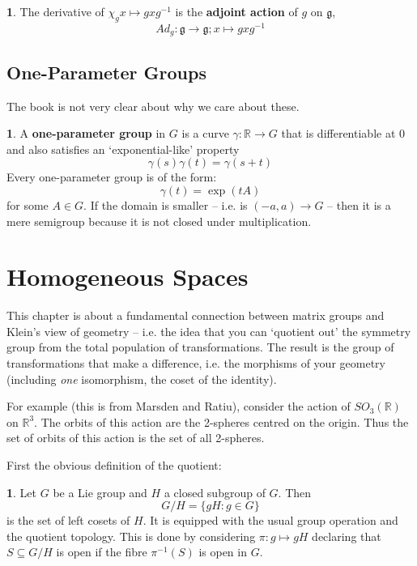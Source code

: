 \documentclass[oneside,english]{amsbook}
\numberwithin{section}{chapter}
\theoremstyle{plain}
\theoremstyle{definition}
\newtheorem{defn}[thm]{\protect\definitionname}
\providecommand{\definitionname}{Definition}
\begin{document}
\begin{defn}
	The derivative of $\chi_g x\mapsto gxg^{-1}$ is the \textbf{adjoint action} of $g$ on $\mathfrak{g}$,
	\[
		Ad_g:\mathfrak{g}\to \mathfrak{g} ; x\mapsto gxg^{-1}
	\]
\end{defn}



\subsection{One-Parameter Groups}

The book is not very clear about why we care about these.

\begin{defn}
	A \textbf{one-parameter group} in $G$ is a curve $\gamma: \mathbb{R}\to G$ that is differentiable at 0 and also satisfies an `exponential-like' property
	\[
	\gamma(s)\gamma(t) = \gamma(s + t)
	\]
	Every one-parameter group is of the form:
	\[
	\gamma(t) = \exp(tA)
	\]
	for some $A\in G$.
	If the domain is smaller -- i.e. is $(-a, a)\to G$ -- then it is a mere semigroup because it is not closed under multiplication.
\end{defn}

\section{Homogeneous Spaces}

This chapter is about a fundamental connection between matrix groups and Klein's view of geometry -- i.e. the idea that you can `quotient out' the symmetry group from the total population of transformations. The result is the group of transformations that make a difference, i.e. the morphisms of your geometry (including \emph{one} isomorphism, the coset of the identity).

For example (this is from Marsden and Ratiu), consider the action of $SO_3(\mathbb{R})$ on $\mathbb{R}^3$. The orbits of this action are the 2-spheres centred on the origin. Thus the set of orbits of this action is the set of all 2-spheres.

First the obvious definition of the quotient:
\begin{defn}
	Let $G$ be a Lie group and $H$ a closed subgroup of $G$. Then 
	\[
		G/H = \{gH : g\in G\}
	\]
	is the set of left cosets of $H$. It is equipped with the usual group operation and the quotient topology. This is done by considering $\pi:g\mapsto gH$ declaring that $S\subseteq G/H$ is open if the fibre $\pi^{-1}(S)$ is open in $G$.
\end{defn}
\end{document}
